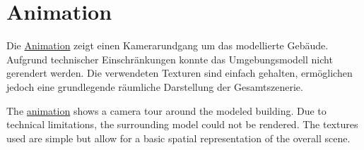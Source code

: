 \section{Animation}
\begin{German}
    Die \href{https://n-joy-nas.quickconnect.to/d/s/13WdvrDK9DU26WWH7K7YgObwbntu93YO/ulhFUyCAh7bS6LBXbd99r1QpgsKEpiXI-37SgdYNkTww}{Animation} zeigt einen Kamerarundgang um das modellierte Gebäude. Aufgrund technischer Einschränkungen konnte das Umgebungsmodell nicht gerendert werden. Die verwendeten Texturen sind einfach gehalten, ermöglichen jedoch eine grundlegende räumliche Darstellung der Gesamtszenerie.
\end{German}

\begin{English}
    The \href{https://n-joy-nas.quickconnect.to/d/s/13WdvrDK9DU26WWH7K7YgObwbntu93YO/ulhFUyCAh7bS6LBXbd99r1QpgsKEpiXI-37SgdYNkTww}{animation} shows a camera tour around the modeled building. Due to technical limitations, the surrounding model could not be rendered. The textures used are simple but allow for a basic spatial representation of the overall scene.
\end{English}
